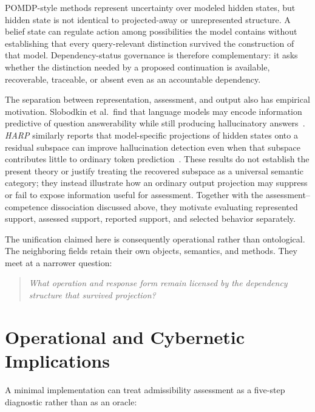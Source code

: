 \documentclass[11pt]{article}
\theoremstyle{definition}
\theoremstyle{remark}
\begin{document}
POMDP-style methods represent uncertainty over modeled hidden states, but hidden state is not identical to projected-away or unrepresented structure. A belief state can regulate action among possibilities the model contains without establishing that every query-relevant distinction survived the construction of that model. Dependency-status governance is therefore complementary: it asks whether the distinction needed by a proposed continuation is available, recoverable, traceable, or absent even as an accountable dependency.

The separation between representation, assessment, and output also has empirical motivation. Slobodkin et al.\ find that language models may encode information predictive of question answerability while still producing hallucinatory answers~\cite{Slobodkin2023}. \emph{HARP} similarly reports that model-specific projections of hidden states onto a residual subspace can improve hallucination detection even when that subspace contributes little to ordinary token prediction~\cite{Hu2026HARP}. These results do not establish the present theory or justify treating the recovered subspace as a universal semantic category; they instead illustrate how an ordinary output projection may suppress or fail to expose information useful for assessment. Together with the assessment--competence dissociation discussed above, they motivate evaluating represented support, assessed support, reported support, and selected behavior separately.

The unification claimed here is consequently operational rather than ontological. The neighboring fields retain their own objects, semantics, and methods. They meet at a narrower question:

\begin{quote}
\centering
\emph{What operation and response form remain licensed by the dependency structure that survived projection?}
\end{quote}

\section{Operational and Cybernetic Implications}

A minimal implementation can treat admissibility assessment as a five-step diagnostic rather than as an oracle:
\end{document}
